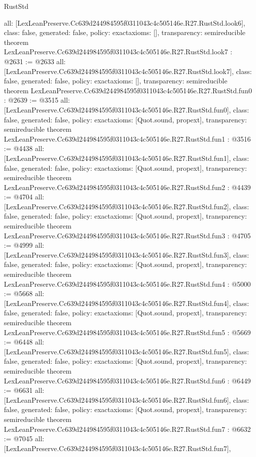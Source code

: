 \begin{lexlean}{RustStd}
\begin{coremodule}
{  all: [LexLeanPreserve.Cc639d244984595f0311043c4c505146e.R27.RustStd.look6],
  class: false,
  generated: false,
  policy: exact{axioms: []},
  transparency: semireducible
}
theorem LexLeanPreserve.Cc639d244984595f0311043c4c505146e.R27.RustStd.look7 : @2631 := @2633 {
  all: [LexLeanPreserve.Cc639d244984595f0311043c4c505146e.R27.RustStd.look7],
  class: false,
  generated: false,
  policy: exact{axioms: []},
  transparency: semireducible
}
theorem LexLeanPreserve.Cc639d244984595f0311043c4c505146e.R27.RustStd.fun0 : @2639 := @3515 {
  all: [LexLeanPreserve.Cc639d244984595f0311043c4c505146e.R27.RustStd.fun0],
  class: false,
  generated: false,
  policy: exact{axioms: [Quot.sound, propext]},
  transparency: semireducible
}
theorem LexLeanPreserve.Cc639d244984595f0311043c4c505146e.R27.RustStd.fun1 : @3516 := @4438 {
  all: [LexLeanPreserve.Cc639d244984595f0311043c4c505146e.R27.RustStd.fun1],
  class: false,
  generated: false,
  policy: exact{axioms: [Quot.sound, propext]},
  transparency: semireducible
}
theorem LexLeanPreserve.Cc639d244984595f0311043c4c505146e.R27.RustStd.fun2 : @4439 := @4704 {
  all: [LexLeanPreserve.Cc639d244984595f0311043c4c505146e.R27.RustStd.fun2],
  class: false,
  generated: false,
  policy: exact{axioms: [Quot.sound, propext]},
  transparency: semireducible
}
theorem LexLeanPreserve.Cc639d244984595f0311043c4c505146e.R27.RustStd.fun3 : @4705 := @4999 {
  all: [LexLeanPreserve.Cc639d244984595f0311043c4c505146e.R27.RustStd.fun3],
  class: false,
  generated: false,
  policy: exact{axioms: [Quot.sound, propext]},
  transparency: semireducible
}
theorem LexLeanPreserve.Cc639d244984595f0311043c4c505146e.R27.RustStd.fun4 : @5000 := @5668 {
  all: [LexLeanPreserve.Cc639d244984595f0311043c4c505146e.R27.RustStd.fun4],
  class: false,
  generated: false,
  policy: exact{axioms: [Quot.sound, propext]},
  transparency: semireducible
}
theorem LexLeanPreserve.Cc639d244984595f0311043c4c505146e.R27.RustStd.fun5 : @5669 := @6448 {
  all: [LexLeanPreserve.Cc639d244984595f0311043c4c505146e.R27.RustStd.fun5],
  class: false,
  generated: false,
  policy: exact{axioms: [Quot.sound, propext]},
  transparency: semireducible
}
theorem LexLeanPreserve.Cc639d244984595f0311043c4c505146e.R27.RustStd.fun6 : @6449 := @6631 {
  all: [LexLeanPreserve.Cc639d244984595f0311043c4c505146e.R27.RustStd.fun6],
  class: false,
  generated: false,
  policy: exact{axioms: [Quot.sound, propext]},
  transparency: semireducible
}
theorem LexLeanPreserve.Cc639d244984595f0311043c4c505146e.R27.RustStd.fun7 : @6632 := @7045 {
  all: [LexLeanPreserve.Cc639d244984595f0311043c4c505146e.R27.RustStd.fun7],
}
\end{coremodule}
\end{lexlean}
